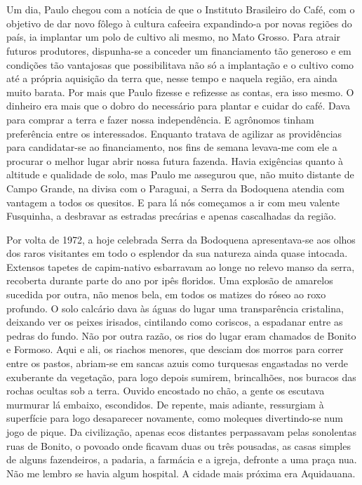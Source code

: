 \chapter{}
Um dia, Paulo chegou com a notícia de que o Instituto Brasileiro do Café, com o objetivo de dar novo fôlego à cultura cafeeira expandindo-a por novas regiões do país, ia implantar um polo de cultivo ali mesmo, no Mato Grosso.
Para atrair futuros produtores, dispunha-se a conceder um financiamento tão generoso e em condições tão vantajosas que possibilitava não só a implantação e o cultivo como até a própria aquisição da terra que, nesse tempo e naquela região, era ainda muito barata.
Por mais que Paulo fizesse e refizesse as contas, era isso mesmo.
O dinheiro era mais que o dobro do necessário para plantar e cuidar do café.
Dava para comprar a terra e fazer nossa independência.
E agrônomos tinham preferência entre os interessados.
Enquanto tratava de agilizar as providências para candidatar-se ao financiamento, nos fins de semana levava-me com ele a procurar o melhor lugar abrir nossa futura fazenda.
Havia exigências quanto à altitude e qualidade de solo, mas Paulo me assegurou que, não muito distante de Campo Grande, na divisa com o Paraguai, a Serra da Bodoquena atendia com vantagem a todos os quesitos.
E para lá nós começamos a ir com meu valente Fusquinha, a desbravar as estradas precárias e apenas cascalhadas da região.

Por volta de 1972, a hoje celebrada Serra da Bodoquena apresentava-se aos olhos dos raros visitantes em todo o esplendor da sua natureza ainda quase intocada.
Extensos tapetes de capim-nativo esbarravam ao longe no relevo manso da serra, recoberta durante parte do ano por ipês floridos.
Uma explosão de amarelos sucedida por outra, não menos bela, em todos os matizes do róseo ao roxo profundo.
O solo calcário dava às águas do lugar uma transparência cristalina, deixando ver os peixes irisados, cintilando como coriscos, a espadanar entre as pedras do fundo.
Não por outra razão, os rios do lugar eram chamados de Bonito e Formoso.
Aqui e ali, os riachos menores, que desciam dos morros para correr entre os pastos, abriam-se em sancas azuis como turquesas engastadas no verde exuberante da vegetação, para logo depois sumirem, brincalhões, nos buracos das rochas ocultas sob a terra.
Ouvido encostado no chão, a gente os escutava murmurar lá embaixo, escondidos.
De repente, mais adiante, ressurgiam à superfície para logo desaparecer novamente, como moleques divertindo-se num jogo de pique.
 Da civilização, apenas ecos distantes perpassavam pelas sonolentas ruas de Bonito, o povoado onde ficavam duas ou três pousadas, as casas simples de alguns fazendeiros, a padaria, a farmácia e a igreja, defronte a uma praça nua.
Não me lembro se havia algum hospital.
A cidade mais próxima era Aquidauana.

